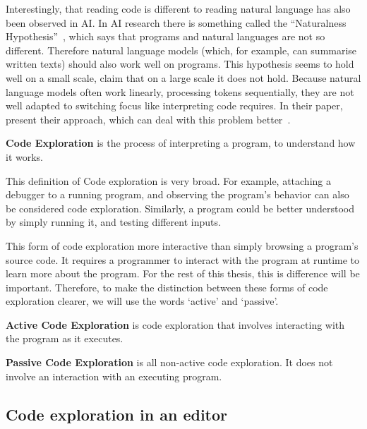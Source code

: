 Interestingly, that reading code is different to reading natural language has also been observed in \ac{AI}.
In \ac{AI} research there is something called the ``Naturalness Hypothesis''~\autocite{AllamanisBDS18}, which says
that programs and natural languages are not so different.
Therefore natural language models (which, for example, can summarise written texts) should also work well on programs.
This hypothesis seems to hold well on a small scale, \citeauthor{Ben-NunJH18} claim that on a large scale it does not hold.
Because natural language models often work linearly, processing tokens sequentially, they are not well adapted to switching
focus like interpreting code requires.
In their paper, \citeauthor{Ben-NunJH18} present their approach, which can deal with this problem
better~\autocite*{Ben-NunJH18}.

\begin{definition}
    \textbf{Code Exploration} is the process of interpreting a program, to understand how it works.
\end{definition}

This definition of Code exploration is very broad.
For example, attaching a debugger to a running program, and observing the program's behavior can also be considered
code exploration.
Similarly, a program could be better understood by simply running it, and testing different inputs.

This form of code exploration more interactive than simply browsing a program's source code.
It requires a programmer to interact with the program at runtime to learn more about the program.
For the rest of this thesis, this is difference will be important.
Therefore, to make the distinction between these forms of code exploration clearer, we will use the words `active' and `passive'.

\begin{definition}
    \textbf{Active Code Exploration} is code exploration that involves interacting with the program as it executes.
\end{definition}
\begin{definition}
    \textbf{Passive Code Exploration} is all non-active code exploration.
    It does not involve an interaction with an executing program.
\end{definition}

\subsection*{Code exploration in an editor}

